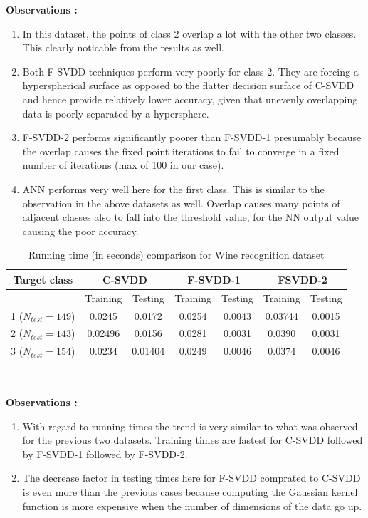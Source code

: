 \documentclass{article} %
\begin{document}
\textbf{Observations :}
\begin{enumerate}
\item In this dataset, the points of class 2 overlap a lot with the other two classes. This clearly noticable from the results as well.
\item Both F-SVDD techniques perform very poorly for class 2. They are forcing a hyperspherical surface as opposed to the flatter decision surface of C-SVDD and hence provide relatively lower accuracy, given that unevenly overlapping data is poorly separated by a hypersphere.
\item F-SVDD-2 performs significantly poorer than F-SVDD-1 presumably because the overlap causes the fixed point iterations to fail to converge in a fixed number of iterations (max of 100 in our case).
\item ANN performs very well here for the first class. This is similar to the observation in the above datasets as well. Overlap causes many points of adjacent classes also to fall into the threshold value, for the NN output value causing the poor accuracy.
\end{enumerate}


\begin{table}[H]
\begin{center}
\caption{Running time (in seconds) comparison for Wine recognition dataset}
\begin{tabular}{|c|c|c|c|c|c|c|}
\hline
Target class & \multicolumn{2}{|c|}{C-SVDD} & \multicolumn{2}{|c|}{F-SVDD-1} & \multicolumn{2}{|c|}{FSVDD-2}  \\ \hline
& Training & Testing & Training & Testing & Training & Testing \\ \hline
1 ($N_{test} =149$)  & 0.0245 & 0.0172 & 0.0254  & 0.0043  & 0.03744 & 0.0015 \\ \hline
2 ($N_{test} =143$) & 0.02496 & 0.0156 & 0.0281  &  0.0031 & 0.0390 & 0.0031 \\ \hline
3 ($N_{test} =154$) &  0.0234 & 0.01404 & 0.0249  & 0.0046 & 0.0374 & 0.0046 \\ \hline

\end{tabular} \\[5pt]
\end{center}
\end{table}


\textbf{Observations :}
\begin{enumerate}
\item With regard to running times the trend is very similar to what was observed for the previous two datasets. Training times are fastest for C-SVDD followed by F-SVDD-1 followed by F-SVDD-2.
\item The decrease factor in testing times here for F-SVDD comprated to C-SVDD is even more than the previous cases because computing the Gaussian kernel function is more expensive when the number of dimensions of the data go up.
\end{enumerate}
\end{document}
